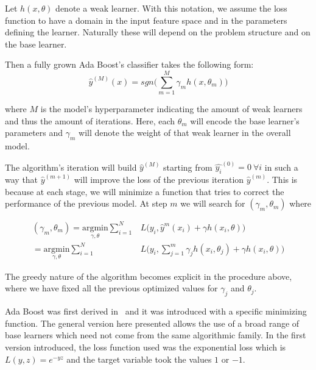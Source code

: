 Let $h(x,\theta)$ denote a weak learner.
With this notation, we assume the loss function to have a domain in the input feature space and in the parameters defining the learner.
Naturally these will depend on the problem structure and on the base learner.

Then a fully grown Ada Boost's classifier takes the following form:
\begin{equation}\label{eq:adaBoostModel}
\hat{y}^{(M)}(x) = sgn\big(\sum_{m=1}^{M} \gamma_m h(x,\theta_m)\big)
\end{equation}

where $M$ is the model's hyperparameter indicating the amount of weak learners and thus the amount of iterations.
Here, each $\theta_m$ will encode the base learner's parameters and $\gamma_m$ will denote the weight of that weak learner in the overall model.

The algorithm's iteration will build $\hat{y}^{(M)}$ starting from $\hat{y_i}^{(0)}= 0 \  \forall i$ in such a way that $\hat{y}^{(m+1)}$ will improve the loss of the previous iteration  $\hat{y}^{(m)}$. 
This is because at each stage, we will minimize a function that tries to correct the performance of the previous model.
At step $m$ we will search for $(\gamma_{m}, \theta_{m})$ where

\begin{equation}\label{eq:adaBoostIteration}
\begin{split}
(\gamma_{m}, \theta_{m}) = \underset{\gamma, \theta}{\mathrm{argmin}} \sum_{i=1}^{N} & L\big( y_i,  \hat{y}^{m}(x_i) + \gamma h(x_i,\theta) \big) \\
= \underset{\gamma, \theta}{\mathrm{argmin}} \sum_{i=1}^{N} & L\big( y_i,  \sum_{j=1}^{m} \gamma_j h(x_i,\theta_j) + \gamma h(x_i,\theta) \big)
\end{split}
\end{equation}

The greedy nature of the algorithm becomes explicit in the procedure above, where we have fixed all the previous optimized values for $\gamma_j$ and $\theta_j$.

Ada Boost was first derived in~\citep{schapire-adaBoost} and it was introduced with a specific minimizing function.
The general version here presented allows the use of a broad range of base learners which need not come from the same algorithmic family.
In the first version introduced, the loss function used was the exponential loss which is $L(y,z) = e^{-yz}$ and the target variable took the values $1$ or $-1$.

